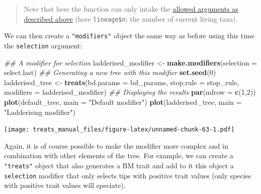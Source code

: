 \documentclass[
]{book}
\newenvironment{Shaded}{\begin{snugshade}}{\end{snugshade}}
\newcommand{\CommentTok}[1]{\textcolor[rgb]{0.56,0.35,0.01}{\textit{#1}}}
\newcommand{\ControlFlowTok}[1]{\textcolor[rgb]{0.13,0.29,0.53}{\textbf{#1}}}
\newcommand{\DataTypeTok}[1]{\textcolor[rgb]{0.13,0.29,0.53}{#1}}
\newcommand{\DecValTok}[1]{\textcolor[rgb]{0.00,0.00,0.81}{#1}}
\newcommand{\KeywordTok}[1]{\textcolor[rgb]{0.13,0.29,0.53}{\textbf{#1}}}
\newcommand{\NormalTok}[1]{#1}
\newcommand{\OperatorTok}[1]{\textcolor[rgb]{0.81,0.36,0.00}{\textbf{#1}}}
\newcommand{\StringTok}[1]{\textcolor[rgb]{0.31,0.60,0.02}{#1}}
\begin{document}
\begin{Shaded}
\end{Shaded}

\begin{quote}
Note that here the function can only intake the \protect\hyperlink{allowarguments}{allowed arguments as described above} (here \texttt{lineage\$n}: the number of current living taxa).
\end{quote}

We can then create a \texttt{"modifiers"} object the same way as before using this time the \texttt{selection} argument:

\begin{Shaded}
\begin{Highlighting}[]
\CommentTok{\#\# A modifier for selection}
\NormalTok{ladderised\_modifier \textless{}{-}}\StringTok{ }\KeywordTok{make.modifiers}\NormalTok{(}\DataTypeTok{selection =}\NormalTok{ select.last)}
\CommentTok{\#\# Generating a new tree with this modifier}
\KeywordTok{set.seed}\NormalTok{(}\DecValTok{0}\NormalTok{)}
\NormalTok{ladderised\_tree \textless{}{-}}\StringTok{ }\KeywordTok{treats}\NormalTok{(}\DataTypeTok{bd.params =}\NormalTok{ bd\_params,}
                        \DataTypeTok{stop.rule =}\NormalTok{ stop\_rule,}
                        \DataTypeTok{modifiers =}\NormalTok{ ladderised\_modifier)}
\CommentTok{\#\# Displaying the results}
\KeywordTok{par}\NormalTok{(}\DataTypeTok{mfrow =} \KeywordTok{c}\NormalTok{(}\DecValTok{1}\NormalTok{,}\DecValTok{2}\NormalTok{))}
\KeywordTok{plot}\NormalTok{(default\_tree,    }\DataTypeTok{main =} \StringTok{"Default modifier"}\NormalTok{)}
\KeywordTok{plot}\NormalTok{(ladderised\_tree, }\DataTypeTok{main =} \StringTok{"Ladderising modifier"}\NormalTok{)}
\end{Highlighting}
\end{Shaded}

\texttt{[image: treats\_manual\_files/figure-latex/unnamed-chunk-63-1.pdf]}

Again, it is of course possible to make the modifier more complex and in combination with other elements of the tree.
For example, we can create a \texttt{"treats"} object that also generates a BM trait and add to it this object a \texttt{selection} modifier that only selects tips with positive trait values (only species with positive trait values will speciate).
\end{document}
